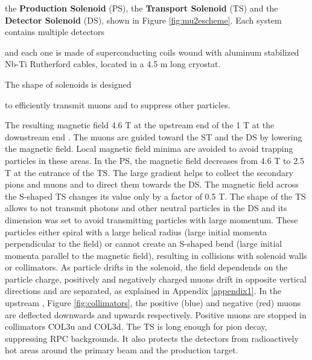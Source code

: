 the \textbf{Production Solenoid} (PS), the \textbf{Transport Solenoid} (TS) 
and the \textbf{Detector Solenoid} (DS), shown in Figure \ref{fig:mu2escheme}. 
{\red Each system contains multiple detectors}

and {\red each one is made of superconducting 
coils wound with aluminum stabilized Nb-Ti Rutherford cables, located in a 4.5 m 
long cryostat.}


{\red The shape of solenoids is designed}

{\red to efficiently transmit muons 
  and to suppress other particles.}

The resulting magnetic field  4.6 T at the upstream end of the 
 1 T at the downstream end . 
The muons are guided toward the ST and the DS by lowering the magnetic field. 
Local magnetic field minima are avoided to avoid trapping particles in these areas. 
In the PS, the magnetic field decreases from 4.6 T to 2.5 T at the entrance of 
the TS. The large gradient helps to collect the secondary pions and muons and to 
direct them towards the DS. The magnetic field across the S-shaped TS changes its 
value only by a factor of 0.5 T. {\red The shape of the TS allows to not transmit photons 
  and other neutral particles in the DS}
and its dimension was set to avoid transmitting 
particles with large momentum. These particles either spiral with a large helical 
radius (large initial momenta perpendicular to the field) or cannot create an 
S-shaped bend (large initial momenta parallel to the magnetic field), resulting 
in collisions with solenoid walls or collimators. As particle drifts in the solenoid,  
the field dependends on the particle charge, positively and negatively charged muons 
drift in opposite vertical directions and are separated, as explained in Appendix 
\ref{appendix1}. In the upstream , Figure 
\ref{fig:collimators}, the  positive (blue) and negative (red) muons 
are deflected downwards and upwards respectively. Positive muons are stopped in 
collimators COL3u and COL3d. The TS is long enough for pion decay, suppressing 
RPC backgrounds.
{\red It also protects the detectors from radioactively hot areas around 
  the primary beam and the production target.}

